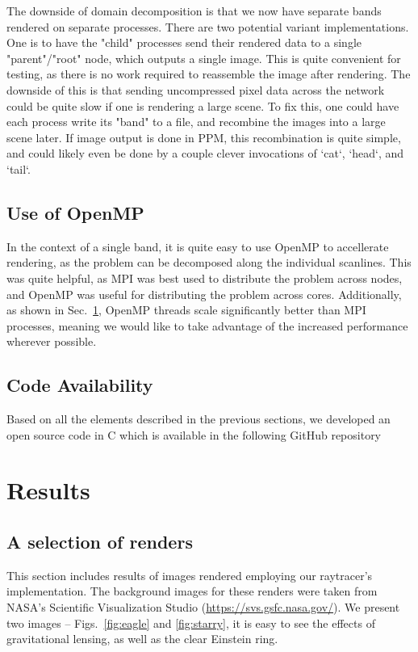 The downside of domain decomposition is that we now have separate bands rendered on separate processes. There are two potential variant implementations. One is to have the "child" processes send their rendered data to a single "parent"/"root" node, which outputs a single image. This is quite convenient for testing, as there is no work required to reassemble the image after rendering. The downside of this is that sending uncompressed pixel data across the network could be quite slow if one is rendering a large scene. To fix this, one could have each process write its "band" to a file, and recombine the images into a large scene later. If image output is done in PPM, this recombination is quite simple, and could likely even be done by a couple clever invocations of `cat`, `head`, and `tail`.


\subsection{Use of OpenMP}
In the context of a single band, it is quite easy to use OpenMP \cite{660313_OMP} to accellerate rendering, as the problem can be decomposed along the individual scanlines. This was quite helpful, as MPI was best used to distribute the problem across nodes, and OpenMP was useful for distributing the problem across cores.
Additionally, as shown in Sec.~\ref{sec:results}, OpenMP threads scale significantly better than MPI processes, meaning we would like to take advantage of the increased performance wherever possible.


\subsection{Code Availability}
Based on all the elements described in the previous sections,
we developed an open source code in C which is available in the following
GitHub repository




\section{Results}
\label{sec:results}

\subsection{A selection of renders}

This section includes results of images rendered employing our raytracer's implementation.
The background images for these renders were taken from NASA's Scientific Visualization Studio (\url{https://svs.gsfc.nasa.gov/}).
We present two images -- Figs.~\ref{fig:eagle} and \ref{fig:starry}, it is easy to see the effects of gravitational lensing, as well as the clear Einstein ring. 


